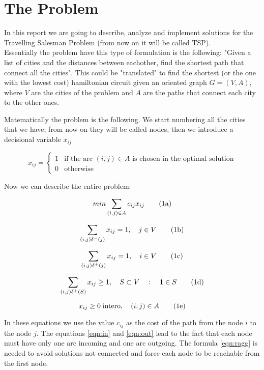 \section{\centering The Problem}

In this report we are going to describe, analyze and implement solutions for the Travelling Salesman Problem (from now on it will be called TSP).\\
Essentially the problem have this type of formulation is the following: "Given a list of cities and the distances between eachother, find the shortest path that connect all the cities".
This could be "translated" to find the shortest (or the one with the lowest cost) hamiltonian circuit given an oriented graph $G=(V, A)$, where $V$ are the cities of the problem and $A$ are the paths that connect each city to the other ones.

Matematically the problem is the following.  We start numbering all the cities that we have, from now on they will be called nodes, then we introduce a decisional variable $x_{ij}$

\begin{equation}
	x_{ij}=
	\begin{cases}
		1 & \text{if the arc $(i, j) \in A$ is chosen in the optimal solution}\\
		0 & \text{otherwise}
	\end{cases}
\end{equation}

Now we can describe the entire problem:

\begin{equation}
	\label{eqn:cost}
	min\sum_{(i,j)\in A}c_{ij}x_{ij}
	\stepcounter{equation}\tag{{\theequation}a}
\end{equation}

\begin{equation}
	\label{eqn:in}
	\sum_{(i,j)\delta^-(j)}x_{ij}=1, \quad j\in V
	\tag{{\theequation}b}
\end{equation}

\begin{equation}
	\label{eqn:out}
	\sum_{(i,j)\delta^+(j)}x_{ij}=1, \quad i\in V
	\tag{{\theequation}c}
\end{equation}

\begin{equation}
	\label{eqn:ragg}
	\sum_{(i,j)\delta^+(S)}x_{ij}\ge 1, \quad S \subset V\quad:\quad 1\in S
	\tag{{\theequation}d}
\end{equation}

\begin{equation}
	x_{ij}\ge 0 \; \text{intero} , \quad (i, j) \in A
	\tag{{\theequation}e}
\end{equation}

In these equations we use the value $c_{ij}$ as the cost of the path from the node $i$ to the node $j$. The equations \ref{eqn:in} and \ref{eqn:out} lead to the fact that each node must have only one arc incoming and one arc outgoing. The formula \ref{eqn:ragg} is needed to avoid solutions not connected and force each node to be reachable from the first node.